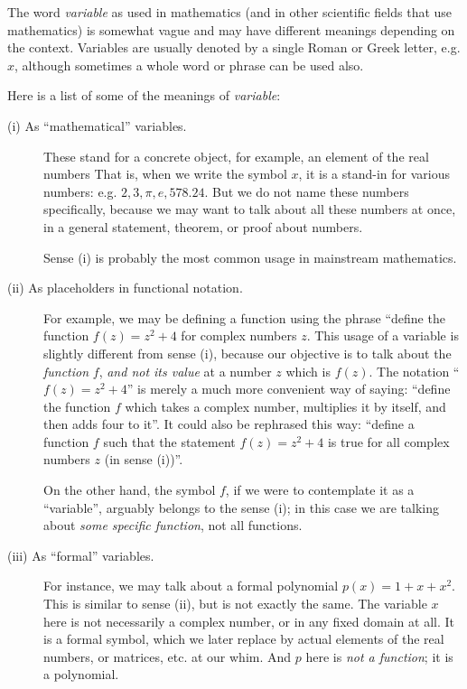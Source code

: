 \documentclass[12pt]{article}
\begin{document}
The word \emph{variable} as used in mathematics (and in other scientific fields that use mathematics) is somewhat vague and may have different meanings depending on the context.  Variables 
are usually denoted by a single Roman or Greek letter, e.g. $x$,
although sometimes a whole word or phrase can be used also.

Here is a list of some of the meanings of \emph{variable}:

\begin{description}
\item[(i) As ``mathematical'' variables.]
These stand for a concrete object, for example, an element of the real numbers
That is, when we write the symbol $x$, it is a stand-in for various numbers:
e.g. $2, 3, \pi, e, 578.24$.
But we do not name these numbers specifically, because we may want to talk
about all these numbers at once, in a general statement, theorem, or proof
about numbers.

Sense (i) is probably the most common usage in mainstream mathematics.

\item[(ii) As placeholders in functional notation.]
For example, we may be defining a function using the phrase 
``define the function $f(z) = z^2 + 4$ for complex numbers $z$.
This usage of a variable is slightly different from sense (i), 
because our objective is to talk about the \emph{function} $f$, 
\emph{and not its value} at a number $z$ which is $f(z)$.  The notation ``$f(z) = z^2 + 4$'' 
is merely a much more convenient way of saying: ``define the function $f$ which takes a complex number, multiplies it by itself, and then adds four to it''.
It could also be rephrased this way:
``define a function $f$ such that the statement $f(z) = z^2 + 4$ 
is true for all complex numbers $z$ (in sense (i))''.

On the other hand, the symbol $f$, if we were to contemplate it as a ``variable'',
arguably belongs to the sense (i); in this case we are talking about
\emph{some specific function}, not all functions.

\item[(iii) As ``formal'' variables.] 
For instance, we may talk about a formal polynomial
$p(x) = 1 + x + x^2$.
This is similar to sense (ii), but is not exactly the same.
The variable $x$ here is not necessarily a complex number, or in any fixed
domain at all.  It is a formal symbol, which we later replace by
actual elements of the real numbers, or matrices, etc. at our whim.
And $p$ here is \emph{not a function}; it is a polynomial.


\end{description}
\end{document}

